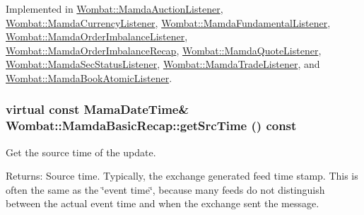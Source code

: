 Implemented in \hyperlink{classWombat_1_1MamdaAuctionListener_9c0f690606ab4ec265fc97235e90c93d}{Wombat::Mamda\-Auction\-Listener}, \hyperlink{classWombat_1_1MamdaCurrencyListener_78906357e4729fb45bf3e80b4d625689}{Wombat::Mamda\-Currency\-Listener}, \hyperlink{classWombat_1_1MamdaFundamentalListener_0262bf50c2afc8dc41440deeb8ba96cd}{Wombat::Mamda\-Fundamental\-Listener}, \hyperlink{classWombat_1_1MamdaOrderImbalanceListener_d8f5442d6f66c8a21c32581c66033146}{Wombat::Mamda\-Order\-Imbalance\-Listener}, \hyperlink{classWombat_1_1MamdaOrderImbalanceRecap_841fcf0b983e68acb4da8b3aad428d47}{Wombat::Mamda\-Order\-Imbalance\-Recap}, \hyperlink{classWombat_1_1MamdaQuoteListener_f9ff48ba9ea68b551b07e18ebef77a51}{Wombat::Mamda\-Quote\-Listener}, \hyperlink{classWombat_1_1MamdaSecStatusListener_1915e75d55253a45e543bffe36393803}{Wombat::Mamda\-Sec\-Status\-Listener}, \hyperlink{classWombat_1_1MamdaTradeListener_0ebdcf5fd43af5725690bf4ed5bdf0d1}{Wombat::Mamda\-Trade\-Listener}, and \hyperlink{classWombat_1_1MamdaBookAtomicListener_43081dcece02d10a8291cd9326c550f3}{Wombat::Mamda\-Book\-Atomic\-Listener}.\hypertarget{classWombat_1_1MamdaBasicRecap_ad502f098385594aa2c3395e1603a93f}{
\subsubsection[getSrcTime]{\setlength{\rightskip}{0pt plus 5cm}virtual const Mama\-Date\-Time\& Wombat::Mamda\-Basic\-Recap::get\-Src\-Time () const}}
\label{classWombat_1_1MamdaBasicRecap_ad502f098385594aa2c3395e1603a93f}


Get the source time of the update. 

\begin{Desc}
\item[Returns:]Source time. Typically, the exchange generated feed time stamp. This is often the same as the \char`\"{}event time\char`\"{}, because many feeds do not distinguish between the actual event time and when the exchange sent the message. \end{Desc}


